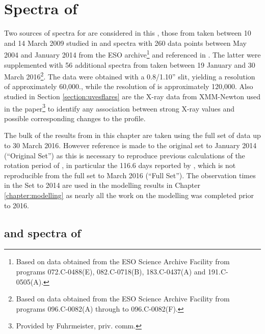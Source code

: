 \chapter{Spectra of \prox}
\protect\label{chapter:proxima}

Two sources of spectra for {\prox} are considered in this \paperorthesis, those from {\uves} taken between 10 and 14
March 2009 studied in \citet{fuhrmeister11} and {\harps} spectra with 260 data points between May 2004 and January 2014
from the ESO archive\footnote{Based on data obtained from the ESO Science Archive Facility from programs 072.C-0488(E),
  082.C-0718(B), 183.C-0437(A) and 191.C-0505(A).} and referenced in \citet[Table 3]{suarezmascareno15}. The latter were
supplemented with 56 additional spectra from {\harps} taken between 19 January and 30 March 2016\footnote{Based on data
  obtained from the ESO Science Archive Facility from programs 096.C-0082(A) through to 096.C-0082(F).}. The {\uves}
data were obtained with a 0.8/1.10'' slit, yielding a resolution of approximately 60,000., while the resolution of {\harps} is
approximately 120,000. Also studied in Section \ref{section:uvesflares} are the X-ray data from XMM-Newton used in the
\citet{fuhrmeister11} paper\footnote{Provided by Fuhrmeister, priv. comm.} to identify any association between strong
X-ray values and possible corresponding changes to the {\ha} profile.

The bulk of the results from {\harps} in this chapter are taken using the full set of data up to 30 March 2016. However
reference is made to the original set to January 2014 (``Original Set'') as this is necessary to reproduce previous
calculations of the rotation period of \prox, in particular the 116.6 days reported by \citet[Table
3]{suarezmascareno15}, which is not reproducible from the full set to March 2016 (``Full Set''). The observation times
in the Set to 2014 are used in the modelling results in Chapter \ref{chapter:modelling} as nearly all the work on the
modelling was completed prior to 2016.

\section{{\harps} and {\uves} spectra of \prox}

